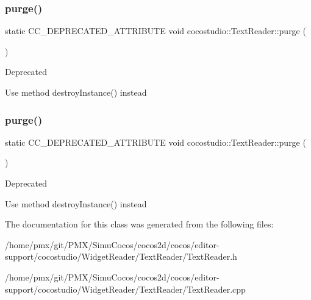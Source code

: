 \subsubsection{\texorpdfstring{purge()}{purge()}\hspace{0.1cm}{\footnotesize\ttfamily [1/2]}}
{\footnotesize\ttfamily static C\+C\+\_\+\+D\+E\+P\+R\+E\+C\+A\+T\+E\+D\+\_\+\+A\+T\+T\+R\+I\+B\+U\+TE void cocostudio\+::\+Text\+Reader\+::purge (\begin{DoxyParamCaption}{ }\end{DoxyParamCaption})\hspace{0.3cm}{\ttfamily [static]}}

\begin{DoxyRefDesc}{Deprecated}
\item[\hyperlink{deprecated__deprecated000110}{Deprecated}]Use method destroy\+Instance() instead \end{DoxyRefDesc}
\mbox{\label{classcocostudio_1_1TextReader_a684f3526eb1350859f153228bd8ede5e}} 
\subsubsection{\texorpdfstring{purge()}{purge()}\hspace{0.1cm}{\footnotesize\ttfamily [2/2]}}
{\footnotesize\ttfamily static C\+C\+\_\+\+D\+E\+P\+R\+E\+C\+A\+T\+E\+D\+\_\+\+A\+T\+T\+R\+I\+B\+U\+TE void cocostudio\+::\+Text\+Reader\+::purge (\begin{DoxyParamCaption}{ }\end{DoxyParamCaption})\hspace{0.3cm}{\ttfamily [static]}}

\begin{DoxyRefDesc}{Deprecated}
\item[\hyperlink{deprecated__deprecated000345}{Deprecated}]Use method destroy\+Instance() instead \end{DoxyRefDesc}


The documentation for this class was generated from the following files\+:\begin{DoxyCompactItemize}
\item 
/home/pmx/git/\+P\+M\+X/\+Simu\+Cocos/cocos2d/cocos/editor-\/support/cocostudio/\+Widget\+Reader/\+Text\+Reader/Text\+Reader.\+h\item 
/home/pmx/git/\+P\+M\+X/\+Simu\+Cocos/cocos2d/cocos/editor-\/support/cocostudio/\+Widget\+Reader/\+Text\+Reader/Text\+Reader.\+cpp\end{DoxyCompactItemize}
